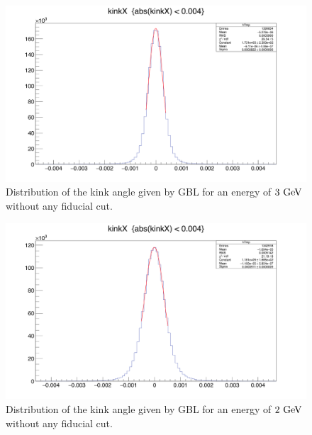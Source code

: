    \begin{figure}[!p]
     \centering
     \includegraphics[width = \textwidth]{Pictures/X0/kinkAngle3GeV.png}
     \caption{Distribution of the kink angle given by GBL for an energy of $3~\rm{GeV}$ without any fiducial cut.}
     \label{fig:kinkAngle3GeV}
   \end{figure} 

   \begin{figure}[!p]
     \centering
     \includegraphics[width = \textwidth]{Pictures/X0/kinkAngle2GeV.png}
     \caption{Distribution of the kink angle given by GBL for an energy of $2~\rm{GeV}$ without any fiducial cut.}
     \label{fig:kinkAngle2GeV}
   \end{figure} 

